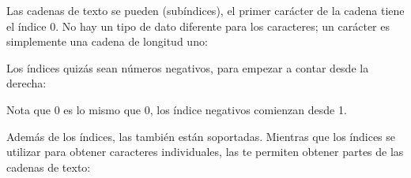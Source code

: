 \documentclass[a4,10pt,spanish]{sphinxmanual}
\begin{document}
\sphinxAtStartPar
Las cadenas de texto se pueden  (subíndices), el primer carácter de la cadena tiene el índice 0. No hay un tipo de dato diferente para los caracteres; un carácter es simplemente una cadena de longitud uno:

\begin{sphinxVerbatim}[commandchars=\\\{\}]
  
\PYG{p}{[}\PYG{p}{]}  
\PYG{p}{[}\PYG{p}{]}  
\end{sphinxVerbatim}

\sphinxAtStartPar
Los índices quizás sean números negativos, para empezar a contar desde la derecha:

\begin{sphinxVerbatim}[commandchars=\\\{\}]
\PYG{p}{[}\PYG{p}{]}  
\PYG{p}{[}\PYG{p}{]}  
\PYG{p}{[}\PYG{p}{]}
\end{sphinxVerbatim}

\sphinxAtStartPar
Nota que \sphinxhyphen{}0 es lo mismo que 0, los índice negativos comienzan desde \sphinxhyphen{}1.

\sphinxAtStartPar
Además de los índices, las  también están soportadas. Mientras que los índices se utilizar para obtener caracteres individuales, las  te permiten obtener partes de las cadenas de texto:

\begin{sphinxVerbatim}[commandchars=\\\{\}]
\PYG{p}{[}\PYG{p}{]}  
\PYG{p}{[}\PYG{p}{]}  
\end{sphinxVerbatim}
\end{document}
